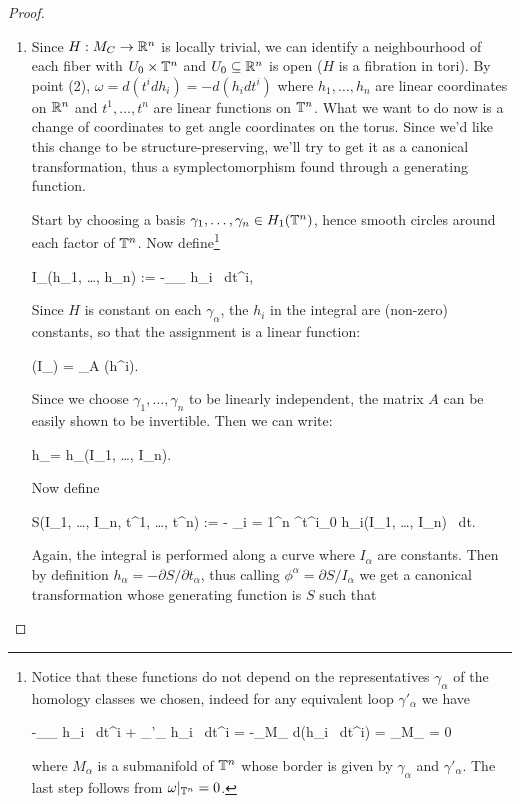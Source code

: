 \documentclass[main.tex]{subfiles}
\begin{document}
\begin{proof}
\begin{enumerate}
		\item Since ${H: M_C \to \mathbb{R}^n}$ is locally trivial, we can identify a neighbourhood of each fiber with $U_0 \times \mathbb{T}^n$ and $U_0 \subseteq \mathbb{R}^n$ is open ($H$ is a fibration in tori). By point (2), $\omega = d(t^i dh_i) = -d(h_i dt^i)$ where $h_1, \ldots, h_n$ are linear coordinates on $\mathbb{R}^n$ and $t^1, \ldots, t^n$ are linear functions on $\mathbb{T}^n$. What we want to do now is a change of coordinates to get angle coordinates on the torus. Since we'd like this change to be structure-preserving, we'll try to get it as a canonical transformation, thus a symplectomorphism found through a generating function.

		Start by choosing a basis $\gamma_1, \ldots, \gamma_n \in H_1(\mathbb{T}^n)$, hence smooth circles around each factor of $\mathbb{T}^n$. Now define\footnote{Notice that these functions do not depend on the representatives $\gamma_\alpha$ of the homology classes we chosen, indeed for any equivalent loop $\gamma'_\alpha$ we have 
		\begin{eqalign}
			-\int_{\gamma_\alpha} h_i \, dt^i + \int_{\gamma'_\alpha} h_i \, dt^i = -\int_{M_\alpha} d(h_i \, dt^i) =  \int_{M_\alpha} \omega = 0
		\end{eqalign}
		where $M_\alpha$ is a submanifold of $\mathbb{T}^n$ whose border is given by $\gamma_\alpha$ and $\gamma'_\alpha$. The last step follows from $\omega\vert_{\mathbb{T}^n}=0$.}
		\begin{eqalign}
			I_\alpha(h_1, \ldots, h_n) := -\int_{\gamma_\alpha} h_i \, dt^i,
		\end{eqalign}
		Since $H$ is constant on each $\gamma_\alpha$, the $h_i$ in the integral are (non-zero) constants, so that the assignment is a linear function:
		\begin{eqalign}
			(I_\alpha) = _A (h^i).
		\end{eqalign}
		Since we choose $\gamma_1, \ldots, \gamma_n$ to be linearly independent, the matrix $A$ can be easily shown to be invertible. Then we can write:
		\begin{eqalign}
			h_\alpha = h_\alpha(I_1, \ldots, I_n).
		\end{eqalign}
		Now define
		\begin{eqalign}
			S(I_1, \ldots, I_n, t^1, \ldots, t^n) := - \sum_{i = 1}^n \int^{t^i}_{0} h_i(I_1, \ldots, I_n) \, dt.
		\end{eqalign}
		Again, the integral is performed along a curve where $I_\alpha$ are constants. Then by definition $h_\alpha = -\partial S / \partial t_\alpha$, thus calling $\phi^\alpha = \partial S / I_\alpha$ we get a canonical transformation whose generating function is $S$ such that

\end{enumerate}
\end{proof}
\end{document}

